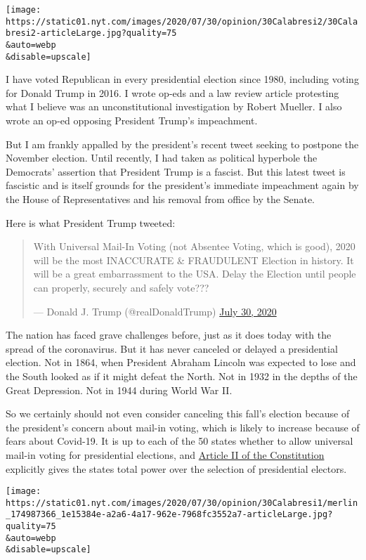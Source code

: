 \texttt{[image: https://static01.nyt.com/images/2020/07/30/opinion/30Calabresi2/30Calabresi2-articleLarge.jpg?quality=75\\\&auto=webp\\\&disable=upscale]}

I have voted Republican in every presidential election since 1980,
including voting for Donald Trump in 2016. I wrote op-eds and a law
review article protesting what I believe was an unconstitutional
investigation by Robert Mueller. I also wrote an op-ed opposing
President Trump's impeachment.

But I am frankly appalled by the president's recent tweet seeking to
postpone the November election. Until recently, I had taken as political
hyperbole the Democrats' assertion that President Trump is a fascist.
But this latest tweet is fascistic and is itself grounds for the
president's immediate impeachment again by the House of Representatives
and his removal from office by the Senate.

Here is what President Trump tweeted:

\begin{quote}
With Universal Mail-In Voting (not Absentee Voting, which is good), 2020
will be the most INACCURATE \& FRAUDULENT Election in history. It will
be a great embarrassment to the USA. Delay the Election until people can
properly, securely and safely vote???

--- Donald J. Trump (@realDonaldTrump)
\href{https://twitter.com/realDonaldTrump/status/1288818160389558273?ref_src=twsrc\%5Etfw}{July
30, 2020}
\end{quote}

The nation has faced grave challenges before, just as it does today with
the spread of the coronavirus. But it has never canceled or delayed a
presidential election. Not in 1864, when President Abraham Lincoln was
expected to lose and the South looked as if it might defeat the North.
Not in 1932 in the depths of the Great Depression. Not in 1944 during
World War II.

So we certainly should not even consider canceling this fall's election
because of the president's concern about mail-in voting, which is likely
to increase because of fears about Covid-19. It is up to each of the 50
states whether to allow universal mail-in voting for presidential
elections, and
\href{https://constitutioncenter.org/interactive-constitution/article/article-ii}{Article
II of the Constitution} explicitly gives the states total power over the
selection of presidential electors.

\texttt{[image: https://static01.nyt.com/images/2020/07/30/opinion/30Calabresi1/merlin\_174987366\_1e15384e-a2a6-4a17-962e-7968fc3552a7-articleLarge.jpg?quality=75\\\&auto=webp\\\&disable=upscale]}

